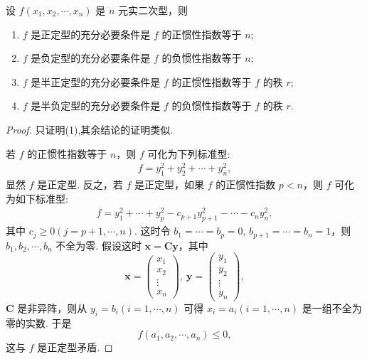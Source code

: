 \documentclass[../../main.tex]{subfiles}%
\begin{document}
\begin{theorem}\label{theorem:正定型的充要条件}
设 $f(x_1,x_2,\cdots,x_n)$ 是 $n$ 元实二次型，则 
\begin{enumerate}[(1)]
\item $f$ 是正定型的充分必要条件是 $f$ 的正惯性指数等于 $n$;

\item $f$ 是负定型的充分必要条件是 $f$ 的负惯性指数等于 $n$; 

\item $f$ 是半正定型的充分必要条件是 $f$ 的正惯性指数等于 $f$ 的秩 $r$; 

\item $f$ 是半负定型的充分必要条件是 $f$ 的负惯性指数等于 $f$ 的秩 $r$.
\end{enumerate}
\end{theorem}
\begin{proof}
只证明(1),其余结论的证明类似. 

若 $f$ 的正惯性指数等于 $n$，则 $f$ 可化为下列标准型:
\begin{align*}
f = y_1^2 + y_2^2 + \cdots + y_n^2,
\end{align*}
显然 $f$ 是正定型. 反之，若 $f$ 是正定型，如果 $f$ 的正惯性指数 $p < n$，则 $f$ 可化为如下标准型:
\begin{align}
f = y_1^2 + \cdots + y_p^2 - c_{p + 1}y_{p + 1}^2 - \cdots - c_ny_n^2,\label{eq:8.4.1}
\end{align}
其中 $c_j\geqslant  0 (j = p + 1,\cdots,n)$. 这时令 $b_1 = \cdots = b_p = 0$, $b_{p + 1} = \cdots = b_n = 1$，则 $b_1,b_2,\cdots,b_n$ 不全为零. 假设这时 $\boldsymbol{x}=\boldsymbol{C}\boldsymbol{y}$，其中
\[
\boldsymbol{x}=\begin{pmatrix}
x_1\\
x_2\\
\vdots\\
x_n
\end{pmatrix},\ \boldsymbol{y}=\begin{pmatrix}
y_1\\
y_2\\
\vdots\\
y_n
\end{pmatrix},
\]
$\boldsymbol{C}$ 是非异阵，则从 $y_i = b_i (i = 1,\cdots,n)$ 可得 $x_i = a_i (i = 1,\cdots,n)$ 是一组不全为零的实数. 于是
\[
f(a_1,a_2,\cdots,a_n)\leqslant  0,
\]
这与 $f$ 是正定型矛盾. 
\end{proof}
\end{document}
